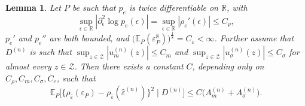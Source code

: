 \documentclass[aos]{imsart}
\newcommand{\R}{\mathbb{R}}
\newcommand{\E}{\mathbb{E}}
\newtheorem{lemma}[theorem]{Lemma}
\begin{document}
	
	\begin{lemma}
		\label{lem:estimatedresidual}
		Let $P$ be such that $p_{e}$ is twice differentiable on $\R$, with \begin{equation*}
			\sup_{\epsilon\in\R} |\partial_\epsilon^2 \log p_{e}(\epsilon)| = \sup_{\epsilon\in\R} |\rho_{e}'(\epsilon)|\leq C_\rho,
		\end{equation*}
		$p_{e}'$ and $ p_{e}''$ are both bounded, and $\big(\E_P(\varepsilon_P^8)\big)^{\frac18} = C_\varepsilon < \infty$. Further assume that $D^{(n)}$ is such that $\sup_{z\in\mathcal{Z}} |u_m^{(n)}(z)|\leq C_m$  and $\sup_{z\in\mathcal{Z}} |u_\sigma^{(n)}(z)|\leq C_\sigma$ for almost every $z\in\mathcal{Z}$. 
		Then there exists a constant $C$, depending only on $C_\rho, C_m, C_\sigma, C_\varepsilon$, such that
		\begin{equation*}
			\E_P\Big[\big\{\rho_{\hat\varepsilon}(\varepsilon_P)-\rho_{\hat\varepsilon}(\hat\varepsilon^{(n)})\big\}^2 \; \Big| \; D^{(n)}\Big] \leq C \big(A_m^{(n)} + A_\sigma^{(n)}\big).
		\end{equation*}
	\end{lemma}
\end{document}
